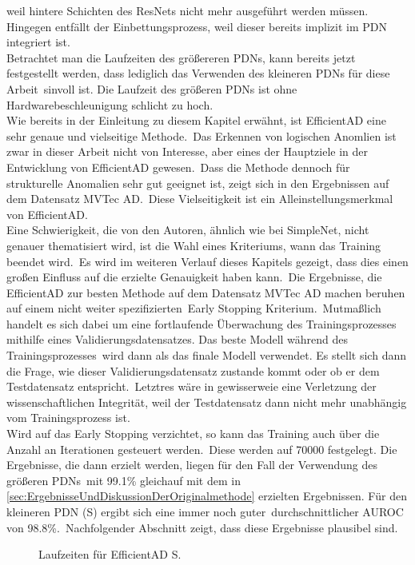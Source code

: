 weil hintere Schichten des ResNets nicht mehr ausgeführt werden müssen. Hingegen entfällt der Einbettungsprozess, weil dieser bereits implizit im PDN integriert ist.\\
Betrachtet man die Laufzeiten des größereren PDNs, kann bereits jetzt festgestellt werden, dass lediglich das Verwenden des kleineren PDNs für diese Arbeit\
sinvoll ist. Die Laufzeit des größeren PDNs ist ohne Hardwarebeschleunigung schlicht zu hoch.\\
Wie bereits in der Einleitung zu diesem Kapitel erwähnt, ist EfficientAD eine sehr genaue und vielseitige Methode.\
Das Erkennen von logischen Anomlien ist zwar in dieser Arbeit nicht von Interesse, aber eines der Hauptziele in der Entwicklung von EfficientAD gewesen.\
Dass die Methode dennoch für strukturelle Anomalien sehr gut geeignet ist, zeigt sich in den Ergebnissen auf dem Datensatz MVTec AD.\
Diese Vielseitigkeit ist ein Alleinstellungsmerkmal von EfficientAD.\\
Eine Schwierigkeit, die von den Autoren, ähnlich wie bei SimpleNet, nicht genauer thematisiert wird, ist die Wahl eines Kriteriums, wann das Training beendet wird.\
Es wird im weiteren Verlauf dieses Kapitels gezeigt, dass dies einen großen Einfluss auf die erzielte Genauigkeit haben kann.\
Die Ergebnisse, die EfficientAD zur besten Methode auf dem Datensatz MVTec AD machen \cite{paperswithcode} beruhen auf einem nicht weiter spezifizierten\
\glqq Early Stopping\grqq{} Kriterium.\
Mutmaßlich handelt es sich dabei um eine fortlaufende Überwachung des Trainingsprozesses mithilfe eines Validierungsdatensatzes. Das beste Modell während des Trainingsprozesses\
wird dann als das finale Modell verwendet. Es stellt sich dann die Frage, wie dieser Validierungsdatensatz zustande kommt oder ob er dem Testdatensatz entspricht.\
Letztres wäre in gewisserweie eine Verletzung der wissenschaftlichen Integrität, weil der Testdatensatz dann nicht mehr unabhängig vom Trainingsprozess ist.\\
Wird auf das Early Stopping verzichtet, so kann das Training auch über die Anzahl an Iterationen gesteuert werden.\
Diese werden auf \num{70000} festgelegt. Die Ergebnisse, die dann erzielt werden, liegen für den Fall der Verwendung des größeren PDNs\
mit \num{99,1}\% gleichauf mit dem in \ref{sec:ErgebnisseUndDiskussionDerOriginalmethode} erzielten Ergebnissen. Für den kleineren PDN (S) ergibt sich eine immer noch guter\
durchschnittlicher AUROC von \num{98,8}\%.\
Nachfolgender Abschnitt zeigt, dass diese Ergebnisse plausibel sind.\\



\begin{figure}[h]
    \centering
    
    \caption{Laufzeiten für EfficientAD S.}
    \label{fig:efficientadlaufzeitensmall}
\end{figure}
